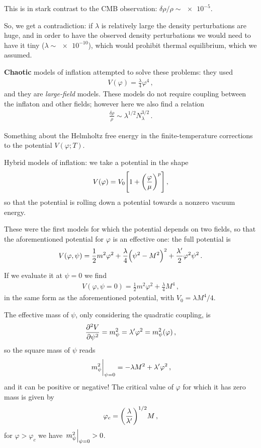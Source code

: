 \documentclass[main.tex]{subfiles}
\begin{document}
This is in stark contrast to the CMB observation: \(\delta \rho /\rho \sim \num{e-5}\). 

So, we get a contradiction: if \(\lambda \) is relatively large the density perturbations are huge, and in order to have the observed density perturbations we would need to have it tiny (\(\lambda \sim \num{e-10}\)), which would prohibit thermal equilibrium, which we assumed. 

\textbf{Chaotic} models of inflation attempted to solve these problems: they used 
%
\begin{align}
V(\varphi ) = \frac{\lambda}{4} \varphi^{4}
\,,
\end{align}
%
and they are \emph{large-field} models. 
These models do not require coupling between the inflaton and other fields; however here we also find a relation 
%
\begin{align}
\frac{ \delta \rho }{\rho } \sim \lambda^{1/2} N_\lambda^{3/2}
\,.
\end{align}

Something about the Helmholtz free energy in the finite-temperature corrections to the potential \(V(\varphi ; T)\). 

Hybrid models of inflation: we take a potential in the shape 
%
\begin{align}
V(\varphi ) = V_0 \qty[1 + \qty(\frac{\varphi }{\mu })^{p}]
\,,
\end{align}
%
so that the potential is rolling down a potential towards a nonzero vacuum energy. 

These were the first models for which the potential depends on two fields, so that the aforementioned potential for \(\varphi \) is an effective one: the full potential is 
%
\begin{align}
V(\varphi , \psi ) = \frac{1}{2} m^2\varphi^2+ \frac{\lambda}{4} \qty(\psi^2-M^2)^2 + \frac{\lambda'}{2} \varphi^2 \psi^2
\,.
\end{align}

If we evaluate it at \(\psi = 0\) we find 
%
\begin{align}
V(\varphi , \psi = 0) = \frac{1}{2} m^2\varphi^2 + \frac{\lambda}{4} M^{4}
\,,
\end{align}
%
in the same form as the aforementioned potential, with \(V_0 = \lambda M^{4} /4\). 

The effective mass of \(\psi \), only considering the quadratic coupling, is
%
\begin{align}
\pdv[2]{V}{\psi } = m^2_\psi = \lambda ' \varphi^2 = m^2_\psi (\varphi )
\,,
\end{align}
%
so the square mass of \(\psi \) reads 
%
\begin{align}
\eval{m^2_\psi}_{\psi = 0} = - \lambda  M^2 + \lambda ' \varphi^2
\,,
\end{align}
%
and it can be positive or negative! The critical value of \(\varphi \) for which it has zero mass is given by 
%
\begin{align}
\varphi _c = \qty( \frac{\lambda }{\lambda'})^{1/2} M
\,,
\end{align}
%
for \(\varphi > \varphi _c\) we have \(\eval{m^2_\psi }_{\psi = 0} > 0\).
\end{document}
